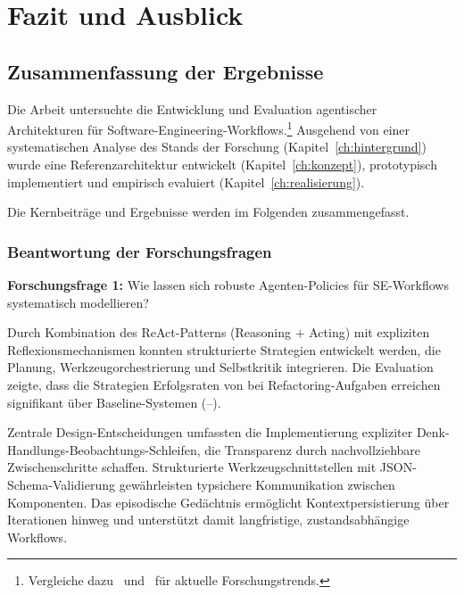 
\chapter{Fazit und Ausblick}
\label{ch:abschluss}%

\section{Zusammenfassung der Ergebnisse}

Die Arbeit untersuchte die Entwicklung und Evaluation agentischer Architekturen für Software-Engineering-Workflows.\footnote{Vergleiche dazu~\cite{xi2023rise} und~\cite{wang2023survey} für aktuelle Forschungstrends.}
Ausgehend von einer systematischen Analyse des Stands der Forschung (Kapitel~\ref{ch:hintergrund}) wurde eine Referenzarchitektur entwickelt (Kapitel~\ref{ch:konzept}), prototypisch implementiert und empirisch evaluiert (Kapitel~\ref{ch:realisierung}).

Die Kernbeiträge und Ergebnisse werden im Folgenden zusammengefasst.

\subsection{Beantwortung der Forschungsfragen}

\textbf{Forschungsfrage 1:} Wie lassen sich robuste Agenten-Policies für SE-Workflows systematisch modellieren?

Durch Kombination des ReAct-Patterns (Reasoning + Acting) mit expliziten Reflexionsmechanismen konnten strukturierte Strategien entwickelt werden, die Planung, Werkzeugorchestrierung und Selbstkritik integrieren. Die Evaluation zeigte, dass die Strategien Erfolgsraten von  bei Refactoring-Aufgaben erreichen \textendash{} signifikant über Baseline-Systemen (--).

Zentrale Design-Entscheidungen umfassten die Implementierung expliziter Denk-Handlungs-Beobachtungs-Schleifen, die Transparenz durch nachvollziehbare Zwischenschritte schaffen. Strukturierte Werkzeugschnittstellen mit JSON-Schema-Validierung gewährleisten typsichere Kommunikation zwischen Komponenten. Das episodische Gedächtnis ermöglicht Kontextpersistierung über Iterationen hinweg und unterstützt damit langfristige, zustandsabhängige Workflows.

